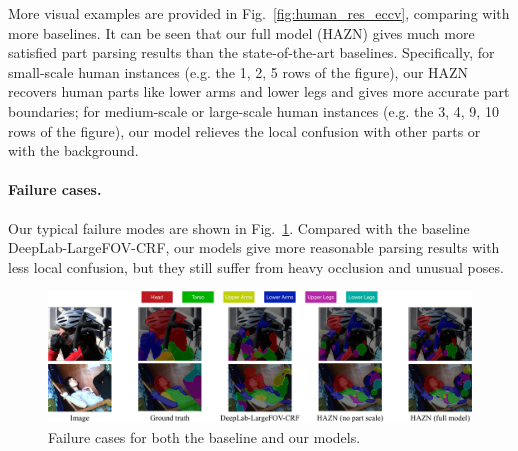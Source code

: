 More visual examples are provided in Fig.~\ref{fig:human_res_eccv}, comparing with more baselines.
It can be seen that our full model (HAZN) gives much more satisfied part parsing results than the state-of-the-art baselines. Specifically, for small-scale human instances (e.g. the 1, 2, 5 rows of the figure), our HAZN recovers human parts like lower arms and lower legs and gives more accurate part boundaries; for medium-scale or large-scale human instances (e.g. the 3, 4, 9, 10 rows of the figure), our model relieves the local confusion with other parts or with the background.

\paragraph{\textbf{Failure cases.}}
Our typical failure modes are shown in Fig.~\ref{fig:seg_image_fail_eccv}. Compared with the baseline DeepLab-LargeFOV-CRF, our models give more reasonable parsing results with less local confusion, but they still suffer from heavy occlusion and unusual poses.

\begin{figure}
\centering
\includegraphics[width=1.0\linewidth]{figs/failure_modes_v2_eccv.pdf}
\caption{Failure cases for both the baseline and our models.}
\label{fig:seg_image_fail_eccv}
\end{figure}

